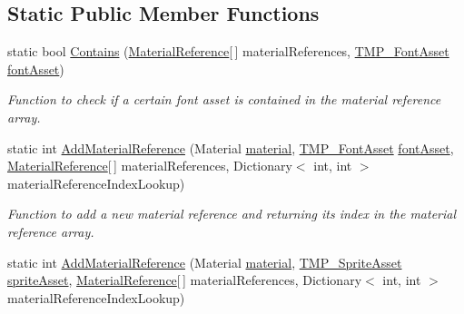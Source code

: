 \subsection*{Static Public Member Functions}
\begin{DoxyCompactItemize}
\item 
static bool \mbox{\hyperlink{struct_t_m_pro_1_1_material_reference_a9b5219f0d1330cd811cfa3aa837d0b33}{Contains}} (\mbox{\hyperlink{struct_t_m_pro_1_1_material_reference}{Material\+Reference}}\mbox{[}$\,$\mbox{]} material\+References, \mbox{\hyperlink{class_t_m_pro_1_1_t_m_p___font_asset}{T\+M\+P\+\_\+\+Font\+Asset}} \mbox{\hyperlink{struct_t_m_pro_1_1_material_reference_a57d6038454b7627a678c178751ae7b2e}{font\+Asset}})
\begin{DoxyCompactList}\small\item\em Function to check if a certain font asset is contained in the material reference array. \end{DoxyCompactList}\item 
static int \mbox{\hyperlink{struct_t_m_pro_1_1_material_reference_a671a784525ebc4709414c442d7af7187}{Add\+Material\+Reference}} (Material \mbox{\hyperlink{struct_t_m_pro_1_1_material_reference_ab5f2e88a52f52cea5eb3f62ff9d452ef}{material}}, \mbox{\hyperlink{class_t_m_pro_1_1_t_m_p___font_asset}{T\+M\+P\+\_\+\+Font\+Asset}} \mbox{\hyperlink{struct_t_m_pro_1_1_material_reference_a57d6038454b7627a678c178751ae7b2e}{font\+Asset}}, \mbox{\hyperlink{struct_t_m_pro_1_1_material_reference}{Material\+Reference}}\mbox{[}$\,$\mbox{]} material\+References, Dictionary$<$ int, int $>$ material\+Reference\+Index\+Lookup)
\begin{DoxyCompactList}\small\item\em Function to add a new material reference and returning its index in the material reference array. \end{DoxyCompactList}\item 
static int \mbox{\hyperlink{struct_t_m_pro_1_1_material_reference_ad911a49231e643344d43a137a8b72baf}{Add\+Material\+Reference}} (Material \mbox{\hyperlink{struct_t_m_pro_1_1_material_reference_ab5f2e88a52f52cea5eb3f62ff9d452ef}{material}}, \mbox{\hyperlink{class_t_m_pro_1_1_t_m_p___sprite_asset}{T\+M\+P\+\_\+\+Sprite\+Asset}} \mbox{\hyperlink{struct_t_m_pro_1_1_material_reference_a1ebf5e832a0bc9cab36327cc0208362e}{sprite\+Asset}}, \mbox{\hyperlink{struct_t_m_pro_1_1_material_reference}{Material\+Reference}}\mbox{[}$\,$\mbox{]} material\+References, Dictionary$<$ int, int $>$ material\+Reference\+Index\+Lookup)
\end{DoxyCompactItemize}
